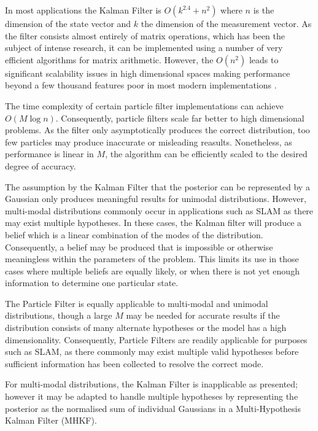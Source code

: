 \documentclass[english]{article}
\begin{document}
In most applications the Kalman Filter is $O(k^{2.4} + n^2)$ where $n$ is the dimension of the state vector and $k$ the dimension of the measurement vector\cite{probrob}. As the filter consists almost entirely of matrix operations, which has been the subject of intense research, it can be implemented using a number of very efficient algorithms for matrix arithmetic. However, the $O(n^2)$ leads to significant scalability issues in high dimensional spaces making performance beyond a few thousand features poor in most modern implementations \cite{Thrun02d}.

The time complexity of certain particle filter implementations can achieve $O(M \log n)$\cite{Thrun02d}. Consequently, particle filters scale far better to high dimensional problems. As the filter only asymptotically produces the correct distribution, too few particles may produce inaccurate or misleading reasults. Nonetheless, as performance is linear in $M$, the algorithm can be efficiently scaled to the desired degree of accuracy.

The assumption by the Kalman Filter that the posterior can be represented by a Gaussian only produces meaningful results for unimodal distributions. However, multi-modal distributions commonly occur in applications such as SLAM as there may exist multiple hypotheses. In these cases, the Kalman filter will produce a belief which is a linear combination of the modes of the distribution. Consequently, a belief may be produced that is impossible or otherwise meaningless within the parameters of the problem. This limits its use in those cases where multiple beliefs are equally likely, or when there is not yet enough information to determine one particular state.

The Particle Filter is equally applicable to multi-modal and unimodal distributions, though a large $M$ may be needed for accurate results if the distribution consists of many alternate hypotheses or the model has a high dimensionality. Consequently, Particle Filters are readily applicable for purposes such as SLAM, as there commonly may exist multiple valid hypotheses before sufficient information has been collected to resolve the correct mode. 

For multi-modal distributions, the Kalman Filter is inapplicable as presented; however it may be adapted to handle multiple hypotheses by representing the posterior as the normalised sum of individual Gaussians in a Multi-Hypothesis Kalman Filter (MHKF)\cite{probrob}.
\end{document}
